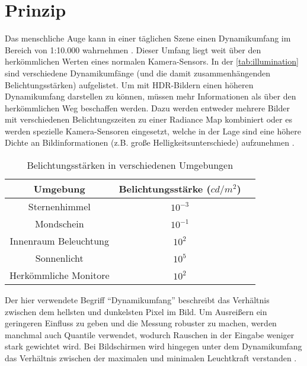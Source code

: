 \section{Prinzip}

Das menschliche Auge kann in einer täglichen Szene einen \gls{Dynamikumfang} im Bereich von 1:10.000 wahrnehmen \cite{Fairchild04theicam}. Dieser Umfang liegt weit über den herkömmlichen Werten eines normalen Kamera-Sensors. In der \autoref{tab:illumination} sind verschiedene Dynamikumfänge (und die damit zusammenhängenden Belichtungsstärken) aufgelistet. 
Um mit \gls{HDR}-Bildern einen höheren \gls{Dynamikumfang} darstellen zu können, müssen mehr Informationen als über den herkömmlichen Weg beschaffen werden. Dazu werden entweder mehrere Bilder mit verschiedenen Belichtungszeiten zu einer \gls{Radiance Map} kombiniert oder es werden spezielle Kamera-Sensoren eingesetzt, welche in der Lage sind eine höhere Dichte an Bildinformationen (z.B. große Helligkeitsunterschiede) aufzunehmen \cite{Yang99a640}. 


\begin{table}[b]
  \begin{center}
    \begin{tabular}{ccc}
	\toprule
	Umgebung & Belichtungsstärke ($cd/m^2$)\\ \midrule
	Sternenhimmel & $10^{-3} $\\	
	Mondschein & $10^{-1} $\\	
	Innenraum Beleuchtung & $10^{2} $\\	
	Sonnenlicht & $10^{5} $\\	
	\midrule
	Herkömmliche Monitore & $10^{2} $\\	
	\bottomrule
    \end{tabular}
    \caption{Belichtungsstärken in verschiedenen Umgebungen \cite[S.~6]{Reinhard}}
    \label{tab:illumination}
  \end{center}
\end{table}



Der hier verwendete Begriff \enquote{\gls{Dynamikumfang}} beschreibt das Verhältnis zwischen dem hellsten und dunkelsten Pixel im Bild. Um Ausreißern ein geringeren Einfluss zu geben und die Messung robuster zu machen, werden manchmal auch Quantile verwendet, wodurch Rauschen in der Eingabe weniger stark gewichtet wird. Bei Bildschirmen wird hingegen unter dem \gls{Dynamikumfang} das Verhältnis zwischen der maximalen und minimalen Leuchtkraft verstanden \cite[S.~4]{Reinhard}.


